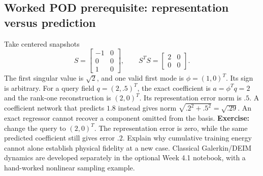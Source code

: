 \documentclass[11pt]{article}
\newcommand{\vect}[1]{\bm{#1}}
\begin{document}
\begin{center}
\end{center}

\subsection{Worked POD prerequisite: representation versus prediction}
Take centered snapshots
\[
S=\begin{bmatrix}-1&0\\0&0\\1&0\end{bmatrix},\qquad
S^TS=\begin{bmatrix}2&0\\0&0\end{bmatrix}.
\]
The first singular value is $\sqrt2$, and one valid first mode is
$\phi=(1,0)^T$. Its sign is arbitrary. For a query field $q=(2,.5)^T$,
the exact coefficient is $a=\phi^Tq=2$ and the rank-one reconstruction is
$(2,0)^T$. Its representation error norm is $.5$. A coefficient network that
predicts $1.8$ instead gives norm $\sqrt{.2^2+.5^2}=\sqrt{.29}$.
An exact regressor cannot recover a component omitted from the basis.
\textbf{Exercise:} change the query to $(2,0)^T$. The representation error is
zero, while the same predicted coefficient still gives error $.2$. Explain
why cumulative training energy cannot alone establish physical fidelity at a
new case. Classical Galerkin/DEIM dynamics are developed separately in the
optional Week 4.1 notebook, with a hand-worked nonlinear sampling example.
\end{document}
